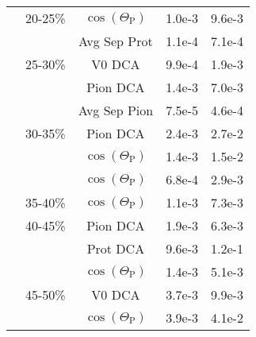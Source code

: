 \begin{table}
\begin{center}
\begin{tabular}{| c | c | c | c | c |}
   & 20-25\% & $\cos(\Theta_{\mathrm{P}})$ & 1.0e-3 & 9.6e-3 \\
   &         & Avg Sep Prot & 1.1e-4 & 7.1e-4 \\
   & 25-30\% & V0 DCA & 9.9e-4 & 1.9e-3\\
   &	         & Pion DCA & 1.4e-3 & 7.0e-3\\
   &         & Avg Sep Pion & 7.5e-5 & 4.6e-4 \\
   & 30-35\% & Pion DCA & 2.4e-3 & 2.7e-2 \\
   &         & $\cos(\Theta_{\mathrm{P}})$ & 1.4e-3 & 1.5e-2 \\
   &         & $\cos(\Theta_{\mathrm{P}})$ & 6.8e-4 & 2.9e-3 \\
   & 35-40\% & $\cos(\Theta_{\mathrm{P}})$ & 1.1e-3 & 7.3e-3 \\
   & 40-45\% & Pion DCA & 1.9e-3 & 6.3e-3 \\
   &         & Prot DCA & 9.6e-3 & 1.2e-1 \\
   &         & $\cos(\Theta_{\mathrm{P}})$ & 1.4e-3 & 5.1e-3 \\ 
   & 45-50\% & V0 DCA & 3.7e-3 & 9.9e-3 \\
   &         & $\cos(\Theta_{\mathrm{P}})$ & 3.9e-3 & 4.1e-2 \\
   \hline
\end{tabular}
\end{center}
\end{table}

